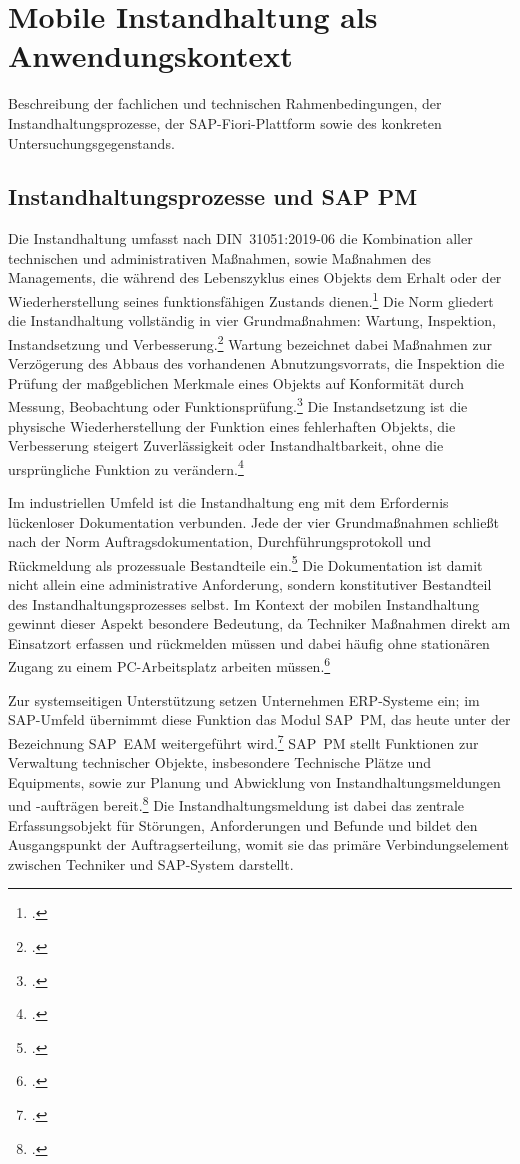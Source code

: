 \chapter{Mobile Instandhaltung als Anwendungskontext}
\label{chapter:kapitel3}
Beschreibung der fachlichen und technischen Rahmenbedingungen, der Instandhaltungsprozesse, 
der SAP-Fiori-Plattform sowie des konkreten Untersuchungsgegenstands.

\section{Instandhaltungsprozesse und SAP PM}
\label{section:Instandhaltungsprozesse}
Die Instandhaltung umfasst nach DIN~31051:2019-06 die Kombination aller technischen und administrativen Maßnahmen, sowie Maßnahmen des 
Managements, die während des Lebenszyklus eines Objekts dem Erhalt oder der Wiederherstellung seines funktionsfähigen Zustands 
dienen.\footcite[Vgl.][Abschnitt~3.1.1]{din31051_2019} Die Norm gliedert die Instandhaltung vollständig in vier Grundmaßnahmen: Wartung, 
Inspektion, Instandsetzung und Verbesserung.\footcite[Vgl.][Abschnitt~4]{din31051_2019} Wartung bezeichnet dabei Maßnahmen zur Verzögerung 
des Abbaus des vorhandenen Abnutzungsvorrats, die Inspektion die Prüfung der maßgeblichen Merkmale eines Objekts auf Konformität durch 
Messung, Beobachtung oder Funktionsprüfung.\footcite[Vgl.][Abschnitte~3.1.2 und~3.1.3]{din31051_2019} Die Instandsetzung ist die physische 
Wiederherstellung der Funktion eines fehlerhaften Objekts, die Verbesserung steigert Zuverlässigkeit oder Instandhaltbarkeit, ohne die 
ursprüngliche Funktion zu verändern.\footcite[Vgl.][Abschnitte~3.1.4 und~3.1.5]{din31051_2019}

Im industriellen Umfeld ist die Instandhaltung eng mit dem Erfordernis lückenloser Dokumentation verbunden. Jede der vier Grundmaßnahmen 
schließt nach der Norm Auftragsdokumentation, Durchführungsprotokoll und Rückmeldung als prozessuale Bestandteile 
ein.\footcite[Vgl.][Abschnitte~3.1.2--3.1.5]{din31051_2019} Die Dokumentation ist damit nicht allein eine administrative Anforderung, 
sondern konstitutiver Bestandteil des Instandhaltungsprozesses selbst. Im Kontext der mobilen Instandhaltung gewinnt dieser Aspekt 
besondere Bedeutung, da Techniker Maßnahmen direkt am Einsatzort erfassen und rückmelden müssen und dabei häufig ohne stationären Zugang 
zu einem PC-Arbeitsplatz arbeiten müssen.\footcite[Vgl.][S.~304-305]{eisenmann_von_2023}

Zur systemseitigen Unterstützung setzen Unternehmen \ac{ERP}-Systeme ein; im SAP-Umfeld übernimmt diese Funktion das Modul SAP~PM, das 
heute unter der Bezeichnung SAP~EAM weitergeführt wird.\footcite[Vgl.][S.~34-35]{liebstueckel_2013} SAP~PM stellt Funktionen zur 
Verwaltung technischer Objekte, insbesondere Technische Plätze und Equipments, sowie zur Planung und Abwicklung von 
Instandhaltungsmeldungen und -aufträgen bereit.\footcite[Vgl.][S.~53ff.]{liebstueckel_2013} Die Instandhaltungsmeldung ist dabei das 
zentrale Erfassungsobjekt für Störungen, Anforderungen und Befunde und bildet den Ausgangspunkt der Auftragserteilung, womit sie das 
primäre Verbindungselement zwischen Techniker und SAP-System darstellt.

